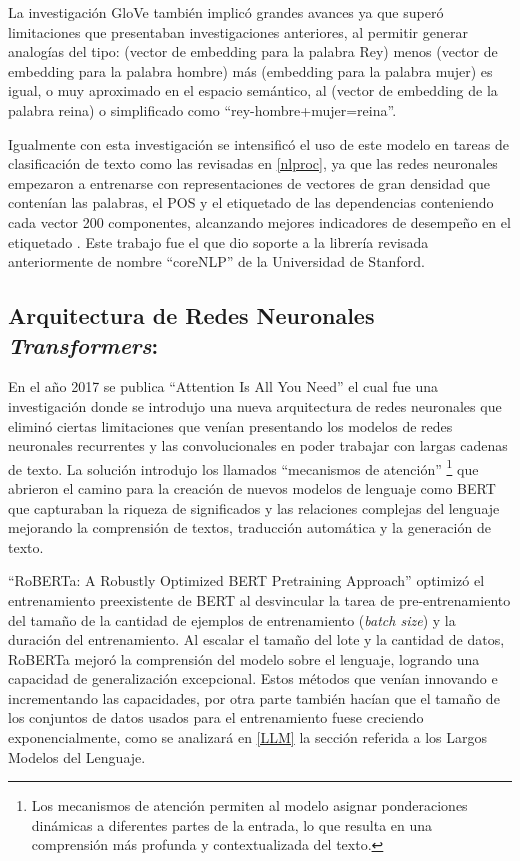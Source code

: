 \documentclass[
  12pt,
  openany]{book}
\begin{document}
La investigación GloVe \citep{pennington2014} también implicó grandes avances ya que superó limitaciones que presentaban investigaciones anteriores, al permitir generar analogías del tipo: (vector de embedding para la palabra Rey) menos (vector de embedding para la palabra hombre) más (embedding para la palabra mujer) es igual, o muy aproximado en el espacio semántico, al (vector de embedding de la palabra reina) o simplificado como ``rey-hombre+mujer=reina''.

Igualmente con esta investigación se intensificó el uso de este modelo en tareas de clasificación de texto como las revisadas en \ref{nlproc}, ya que las redes neuronales empezaron a entrenarse con representaciones de vectores de gran densidad que contenían las palabras, el POS y el etiquetado de las dependencias conteniendo cada vector 200 componentes, alcanzando mejores indicadores de desempeño en el etiquetado \citep{chen2014}. Este trabajo fue el que dio soporte a la librería revisada anteriormente de nombre ``coreNLP'' de la Universidad de Stanford.

\hypertarget{trans}{%
\subsection{\texorpdfstring{Arquitectura de Redes Neuronales \emph{Transformers}:}{Arquitectura de Redes Neuronales Transformers:}}\label{trans}}

En el año 2017 se publica ``Attention Is All You Need'' \citep{vaswani2017} el cual fue una investigación donde se introdujo una nueva arquitectura de redes neuronales que eliminó ciertas limitaciones que venían presentando los modelos de redes neuronales recurrentes y las convolucionales en poder trabajar con largas cadenas de texto. La solución introdujo los llamados ``mecanismos de atención'' \footnote{Los mecanismos de atención permiten al modelo asignar ponderaciones dinámicas a diferentes partes de la entrada, lo que resulta en una comprensión más profunda y contextualizada del texto.} que abrieron el camino para la creación de nuevos modelos de lenguaje como BERT \citep{devlin2018} que capturaban la riqueza de significados y las relaciones complejas del lenguaje mejorando la comprensión de textos, traducción automática y la generación de texto.

``RoBERTa: A Robustly Optimized BERT Pretraining Approach'' \citep{liu2019} optimizó el entrenamiento preexistente de BERT al desvincular la tarea de pre-entrenamiento del tamaño de la cantidad de ejemplos de entrenamiento (\emph{batch size}) y la duración del entrenamiento. Al escalar el tamaño del lote y la cantidad de datos, RoBERTa mejoró la comprensión del modelo sobre el lenguaje, logrando una capacidad de generalización excepcional. Estos métodos que venían innovando e incrementando las capacidades, por otra parte también hacían que el tamaño de los conjuntos de datos usados para el entrenamiento fuese creciendo exponencialmente, como se analizará en \ref{LLM} la sección referida a los Largos Modelos del Lenguaje.
\end{document}
